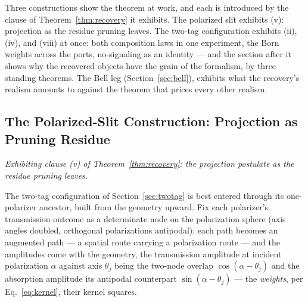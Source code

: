 Three constructions show the theorem at work, and each is introduced by the clause of Theorem~\ref{thm:recovery} it exhibits. The polarized slit exhibits (v): projection as the residue pruning leaves. The two-tag configuration exhibits (ii), (iv), and (viii) at once: both composition laws in one experiment, the Born weights across the ports, no-signaling as an identity --- and the section after it shows why the recovered objects have the grain of the formalism, by three standing theorems. The Bell leg (Section~\ref{sec:bell}), exhibits what the recovery's realism amounts to against the theorem that prices every other realism.

\subsection{The Polarized-Slit Construction: Projection as Pruning Residue}\label{sec:polarized}

\noindent\emph{Exhibiting clause (v) of Theorem~\ref{thm:recovery}: the projection postulate as the residue pruning leaves.}

The two-tag configuration of Section~\ref{sec:twotag} is best entered through its one-polarizer ancestor, built from the geometry upward. Fix each polarizer's transmission outcome as a determinate node on the polarization sphere (axis angles doubled, orthogonal polarizations antipodal): each path becomes an augmented path --- a spatial route carrying a polarization route --- and the amplitudes come with the geometry, the transmission amplitude at incident polarization $\alpha$ against axis $\theta_j$ being the two-node overlap $\cos(\alpha-\theta_j)$ and the absorption amplitude its antipodal counterpart $\sin(\alpha-\theta_j)$ --- the \emph{weights}, per Eq.~\eqref{eq:kernel}, their kernel squares.

